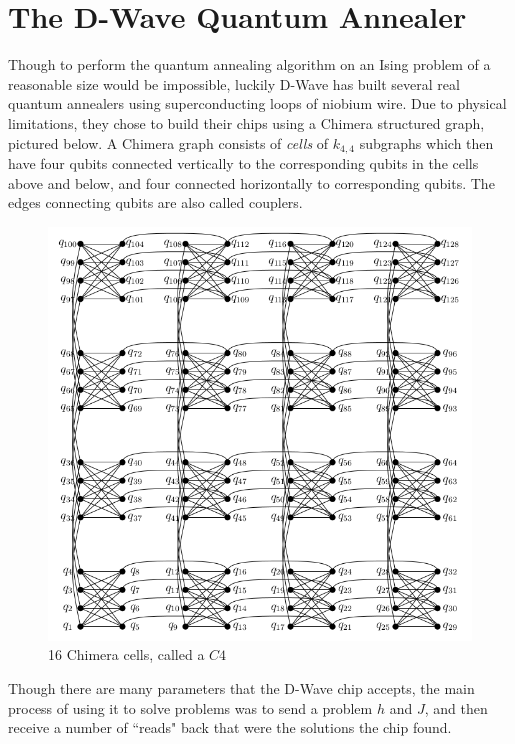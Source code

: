 \documentclass[11pt]{report}
\newcommand{\?}{\stackrel{?}{=}}
\begin{document}
\section{The D-Wave Quantum Annealer}

Though to perform the quantum annealing algorithm on an Ising problem of a reasonable size would be impossible, luckily D-Wave has built several real quantum annealers using superconducting loops of niobium wire. Due to physical limitations, they chose to build their chips using a Chimera structured graph, pictured below. A Chimera graph consists of \textit{cells} of $k_{4,4}$ subgraphs which then have four qubits connected vertically to the corresponding qubits in the cells above and below, and four connected horizontally to corresponding qubits. The edges connecting qubits are also called couplers. 

\begin{figure}[h!]
  \centerline{\includegraphics[width=\linewidth/2]{resources/images/chimera.png}}
  \caption{16 Chimera cells, called a $C4$}
  \label{fig:boat1}
\end{figure}

Though there are many parameters that the D-Wave chip accepts, the main process of using it to solve problems was to send a problem $h$ and $J$, and then receive a number of ``reads" back that were the solutions the chip found.
\end{document}
